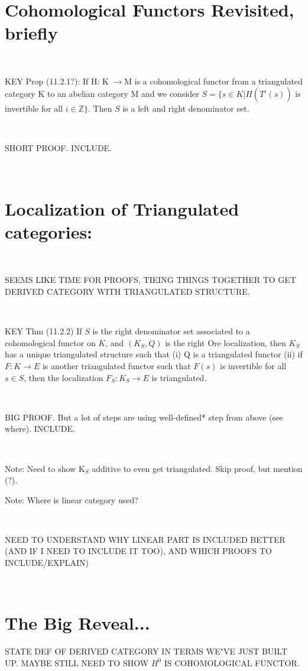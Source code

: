 \documentclass[12pt]{amsart}    %
\theoremstyle{definition}
\begin{document}
\

\section{Cohomological Functors Revisited, briefly}


\

KEY Prop (11.2.1?): If H: K $\rightarrow $M is a cohomological functor from a triangulated category K to an abelian category M and we consider $S = \{ s \in K | H(T^i(s)) $ is invertible for all $i \in \mathbb{Z}\}$.  Then $S$ is a left and right denominator set.  

\

SHORT PROOF. INCLUDE. 

\

\section{Localization of Triangulated categories:}

\

SEEMS LIKE TIME FOR PROOFS, TIEING THINGS TOGETHER TO GET DERIVED CATEGORY WITH TRIANGULATED STRUCTURE. 

\

KEY Thm (11.2.2) If $S$ is the right denominator set associated to a cohomological functor on $K$, and $(K_S, Q)$ is the right Ore localization, then $K_S$ has a unique triangulated structure such that (i) Q is a triangulated functor (ii) if $F : K \rightarrow E$ is another triangulated functor such that $F(s)$ is invertible for all $s \in S$, then the localization $F_S: K_S \rightarrow E$ is triangulated.

\

BIG PROOF. But a lot of steps are using well-defined* step from above (see where).  INCLUDE.

\

Note: Need to show K$_S$ additive to even get triangulated.  Skip proof, but mention (?).

Note: Where is linear category used? 

\

NEED TO UNDERSTAND WHY LINEAR PART IS INCLUDED BETTER (AND IF I NEED TO INCLUDE IT TOO), AND WHICH PROOFS TO INCLUDE/EXPLAIN)

\

\section{The Big Reveal...}

STATE DEF OF DERIVED CATEGORY IN TERMS WE"VE JUST BUILT UP.  MAYBE STILL NEED TO SHOW $H^0$ IS COHOMOLOGICAL FUNCTOR.
\end{document}
